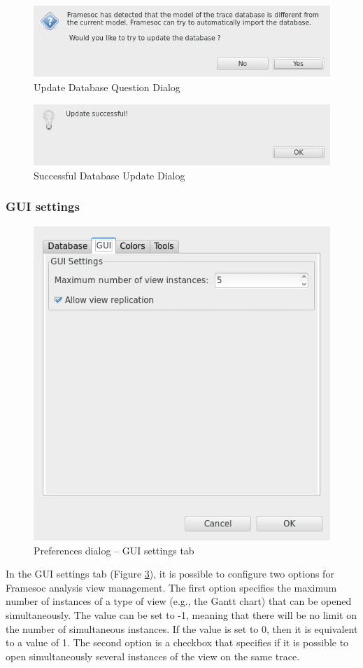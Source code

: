 \documentclass[twoside]{article}
\begin{document}
\begin{sloppypar}
\begin{figure}[h!]
	\centering
	\includegraphics[width=.5\textwidth]{images/updateDBQuestion.png}
	\caption{Update Database Question Dialog}
	\label{fig:updateDBQuestion}
\end{figure}

\begin{figure}[h!]
	\centering
	\includegraphics[width=.5\textwidth]{images/updateDBSuccess.png}
	\caption{Successful Database Update Dialog}
	\label{fig:updateDBSuccess}
\end{figure}

\subsubsection{GUI settings}
\label{subsec:gui}

\begin{figure}[h!]
	\centering
	\includegraphics[width=.5\textwidth]{images/pref_gui.png}
	\caption{Preferences dialog -- GUI settings tab}
	\label{fig:pref_dialog_gui}
\end{figure}

In the GUI settings tab (Figure \ref{fig:pref_dialog_gui}), it is possible to configure two options for Framesoc analysis view management.
The first option specifies the maximum number of instances of a type of view (e.g., the Gantt chart) that can be opened simultaneously. 
The value can be set to -1, meaning that there will be no limit on the number of simultaneous instances. 
If the value is set to 0, then it is equivalent to a value of 1.
The second option is a checkbox that specifies if it is possible to open simultaneously several instances of the view on the same trace.


\end{sloppypar}
\end{document}
